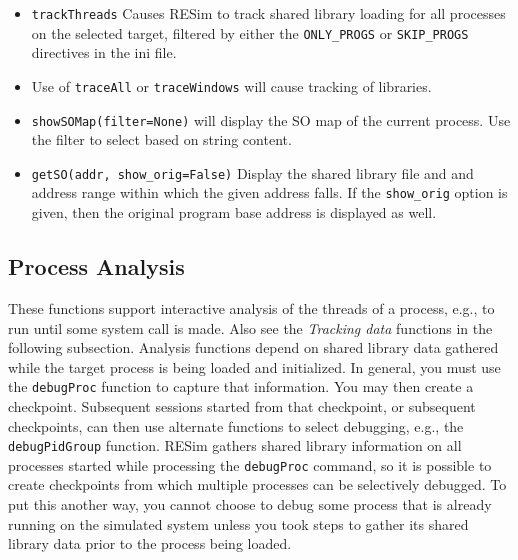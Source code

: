 \documentclass[titlepage]{article}
\begin{document}
\begin{itemize}
\item {\tt trackThreads} Causes RESim to track shared library loading for all processes on the selected target, filtered by either the
{\tt ONLY\_PROGS} or {\tt SKIP\_PROGS} directives in the ini file.
\item Use of {\tt traceAll} or {\tt traceWindows} will cause tracking of libraries.
\item {\tt showSOMap(filter=None)} will display the SO map of the current process.  Use the filter to select based on string content.
\item {\tt getSO(addr, show\_orig=False)} Display the shared library file and and address range within which the given address falls.
If the {\tt show\_orig} option is given, then the original program base address is displayed as well.
\end{itemize}

\subsection{Process Analysis}
These functions support interactive analysis of the threads of a process, e.g., to run until some system call is made.  Also see the \textit{Tracking data} functions
in the following subsection.  Analysis functions depend on shared library data gathered while the target process is being loaded and initialized.  In general, you
must use the {\tt debugProc} function to capture that information.  You may then create a checkpoint.  Subsequent sessions started from that checkpoint,
or subsequent checkpoints, can then use alternate functions to select debugging, e.g., the {\tt debugPidGroup} function. RESim gathers shared library information on
all processes started while processing the {\tt debugProc} command, so it is possible to create checkpoints from which multiple processes can be selectively
debugged.  To put this another way, you cannot choose to debug some process that is already running on the simulated system unless you took steps to
gather its shared library data prior to the process being loaded.
\end{document}
